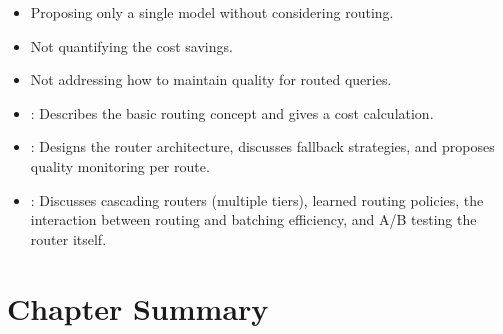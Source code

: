 \begin{interviewq}
\redflags
\begin{itemize}
    \item Proposing only a single model without considering routing.
    \item Not quantifying the cost savings.
    \item Not addressing how to maintain quality for routed queries.
\end{itemize}


\goodgreat
\begin{itemize}
    \item {}: Describes the basic routing concept and gives a cost
          calculation.
    \item {}: Designs the router architecture, discusses fallback strategies,
          and proposes quality monitoring per route.
    \item {}: Discusses cascading routers (multiple tiers), learned routing
          policies, the interaction between routing and batching efficiency, and A/B
          testing the router itself.
\end{itemize}

\end{interviewq}


\section*{Chapter Summary}


